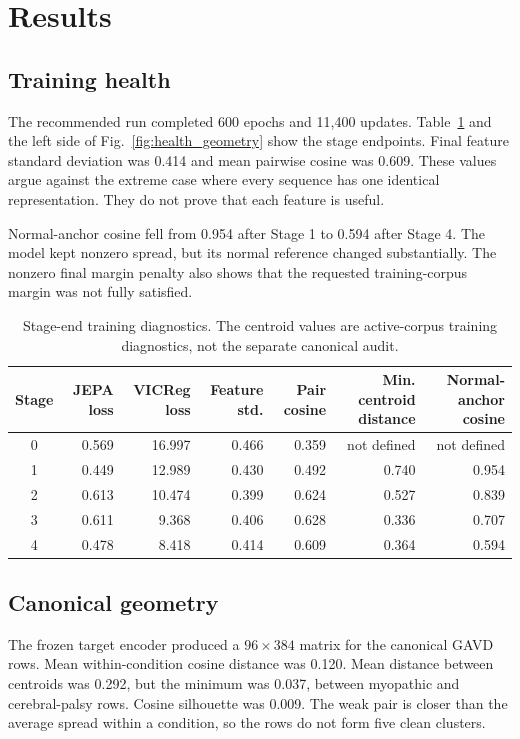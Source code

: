 \documentclass[conference]{IEEEtran}
\begin{document}
\section{Results}
\subsection{Training health}
The recommended run completed 600 epochs and 11,400 updates. Table~\ref{tab:health} and the left side of Fig.~\ref{fig:health_geometry} show the stage endpoints. Final feature standard deviation was 0.414 and mean pairwise cosine was 0.609. These values argue against the extreme case where every sequence has one identical representation. They do not prove that each feature is useful.

Normal-anchor cosine fell from 0.954 after Stage 1 to 0.594 after Stage 4. The model kept nonzero spread, but its normal reference changed substantially. The nonzero final margin penalty also shows that the requested training-corpus margin was not fully satisfied.

\begin{table}[t]
\caption{Stage-end training diagnostics. The centroid values are active-corpus training diagnostics, not the separate canonical audit.}
\label{tab:health}
\centering
\small
\begin{tabular}{crrrrrr}
\toprule
Stage & JEPA loss & VICReg loss & Feature std. & Pair cosine & Min. centroid distance & Normal-anchor cosine \\
\midrule
0 & 0.569 & 16.997 & 0.466 & 0.359 & not defined & not defined \\
1 & 0.449 & 12.989 & 0.430 & 0.492 & 0.740 & 0.954 \\
2 & 0.613 & 10.474 & 0.399 & 0.624 & 0.527 & 0.839 \\
3 & 0.611 & 9.368 & 0.406 & 0.628 & 0.336 & 0.707 \\
4 & 0.478 & 8.418 & 0.414 & 0.609 & 0.364 & 0.594 \\
\bottomrule
\end{tabular}
\end{table}

\subsection{Canonical geometry}
The frozen target encoder produced a $96\times384$ matrix for the canonical GAVD rows. Mean within-condition cosine distance was 0.120. Mean distance between centroids was 0.292, but the minimum was 0.037, between myopathic and cerebral-palsy rows. Cosine silhouette was 0.009. The weak pair is closer than the average spread within a condition, so the rows do not form five clean clusters.
\end{document}
